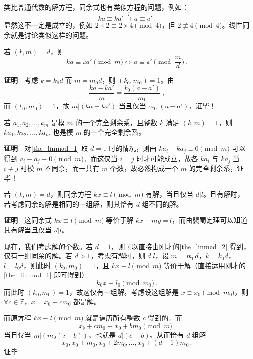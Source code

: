 

类比普通代数的解方程，同余式也有类似方程的问题，例如：
\begin{equation}
ka \equiv ka' \xrightarrow{?} a \equiv a'  ~.
\end{equation}
显然这不一定是成立的，例如 $2 \times 2 \equiv 2 \times 4 \pmod 4$，但 $2 \not \equiv 4 \pmod 4$。线性同余就是讨论类似这样的问题。

\begin{theorem}{}\label{the_linmod_1}
若 $(k, m) = d$，则
\begin{equation}
ka \equiv ka' \pmod m \Leftrightarrow a \equiv a' \pmod{\frac{m}{d}} ~.
\end{equation}
\end{theorem}
\textbf{证明}：考虑 $k = k_0 d$ 而 $m = m_0 d$，则 $(k_0, m_0) = 1$。由
\begin{equation}
\frac{ka - ka'}{m} = \frac{k_0(a - a')}{m_0} ~,
\end{equation}
而 $(k_0, m_0) = 1$，故 $m | (k a - k a')$ 当且仅当 $m_0 | (a - a')$，证毕！

\begin{theorem}{}\label{the_linmod_2}
若 $a_1, a_2, \dots, a_m$ 是模 $m$ 的一个完全剩余系，且整数 $k$ 满足 $(k, m) =1$，则 $ka_1, ka_2, \dots, ka_m$ 也是模 $m$ 的一个完全剩余系。
\end{theorem}
\textbf{证明}：对\autoref{the_linmod_1} 取 $d=1$ 时的情况，则由 $ka_i - ka_j \equiv 0 \pmod m$ 可以得到 $a_i - a_j \equiv 0 \pmod m$。而这仅当 $i = j$ 时才可能成立，故各 $ka_i$ 与 $ka_j$ 当 $i \neq j$ 时模 $m$ 不同余，而一共有 $m$ 个数，故必然构成一个 $m$ 的完全剩余系，证毕！

\begin{theorem}{}
若 $(k, m) = d$，则同余方程 $kx \equiv l \pmod m$ 有解，当且仅当 $d | l$。且有解时，若考虑同余的解是相同的一组解，则其恰有 $d$ 组不同的解。
\end{theorem}
\textbf{证明}：这同余式 $kx \equiv l \pmod m$ 等价于解 $kx - my = l$，而由裴蜀定理可以知道其有解当且仅当 $d | l$。

现在，我们考虑解的个数。若 $d=1$，则可以直接由刚才的\autoref{the_linmod_2} 得到，仅有一组同余的解。若 $d > 1$，考虑有解时，则 $d|l$，设 $m = m_0 d$，$k = k_0 d$，$l = l_0 d$，则此时 $(k_0, m_0) = 1$，且 $kx \equiv l \pmod m$ 等价于解（直接运用刚才的\autoref{the_linmod_1} 即可得到）
\begin{equation}
k_0 x \equiv l_0 \pmod {m_0} ~.
\end{equation}
而此时 $(k_0, m_0) = 1$，故这仅有一组解。考虑设这组解是 $x \equiv x_0 \pmod {m_0}$，则 $\forall c \in \mathbb Z$，$x = x_0 + c m_0$ 都是解。

而原方程 $kx \equiv l \pmod m$ 就是遍历所有整数 $c$ 得到的。而
\begin{equation}
x_0 + c m_0 \equiv x_0 + b m_0 \pmod m ~~
\end{equation}
当且仅当 $m | (m_0 (c - b))$，也就是 $d | (c - b)$。从而恰有 $d$ 组解
\begin{equation}
x_0, x_0 + m_0, x_0 + 2 m_0, \dots, x_0 + (d-1) m_0 ~.
\end{equation}
证毕！